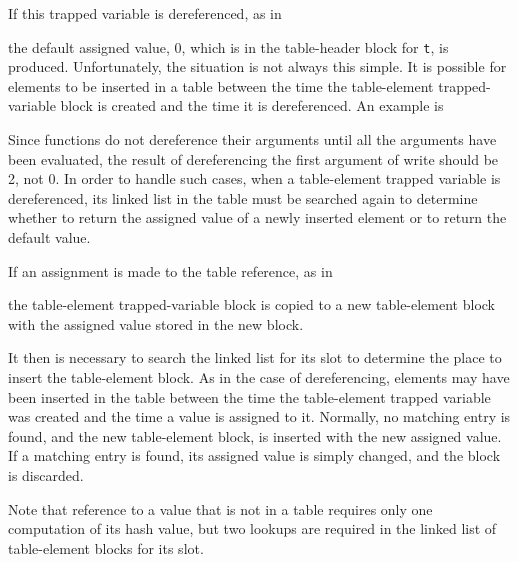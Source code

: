 If this trapped variable is dereferenced, as in


\noindent the default assigned value, 0, which is in the table-header
block for \texttt{t}, is produced. Unfortunately, the situation is not
always this simple. It is possible for elements to be inserted in a
table between the time the table-element trapped-variable block is
created and the time it is dereferenced. An example is


Since functions do not dereference their arguments until all the
arguments have been evaluated, the result of dereferencing the first
argument of write should be 2, not 0. In order to handle such cases,
when a table-element trapped variable is dereferenced, its linked list
in the table must be searched again to determine whether to return the
assigned value of a newly inserted element or to return the default
value.

If an assignment is made to the table reference, as in


\noindent the table-element trapped-variable block is copied to a new
table-element block with the assigned value stored in the new block.

It then is necessary to search the linked list for its slot to %
determine the place to insert the table-element block. As in the case
of dereferencing, elements may have been inserted in the table between
the time the table-element trapped variable was created and the time a
value is assigned to it. Normally, no matching entry is found, and the
new table-element
block, is inserted with the new assigned value.  If a matching entry
is found, its assigned value is simply changed, and the block is
discarded.

Note that reference to a value that is not in a table requires only
one computation of its hash value, but two lookups are required in the
linked list of table-element blocks for its slot.


